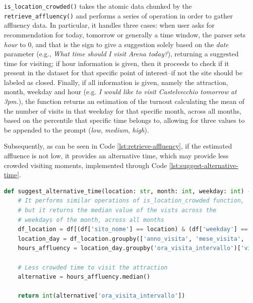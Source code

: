 \texttt{is\_location\_crowded()} takes the atomic data chunked by the \texttt{retrieve\_affluency()} and performs a series of operation in order to gather affluency data. In particular, it handles three cases: when user asks for recommendation for today, tomorrow or generally a time window, the parser sets \textit{hour} to 0, and that is the sign to give a suggestion solely based on the \textit{date} parameter (e.g., \textit{What time should I visit Arena today?}), returning a suggested time for visiting; if hour information is given, then it proceeds to check if it present in the dataset for that specific point of interest--if not the site should be labeled as closed. Finally, if all information is given, namely the attraction, month, weekday and hour (e.g. \textit{I would like to visit Castelvecchio tomorrow at 3pm.}), the function returns an estimation of the turnout calculating the mean of the number of visits in that weekday for that specific month, across all months, based on the percentile that specific time belongs to, allowing for three values to be appended to the prompt (\textit{low}, \textit{medium}, \textit{high}).

Subsequently, as can be seen in Code \ref{lst:retrieve-affluency}, if the estimated affluence is not low, it provides an alternative time, which may provide less crowded visiting moments, implemented through Code \ref{lst:suggest-alternative-time}.

\begin{center}
\begin{lstlisting}[language=Python, frame=single, caption=\texttt{suggest\_alternative\_time()} Function., label=lst:suggest-alternative-time]
def suggest_alternative_time(location: str, month: int, weekday: int) -> str:
    # It performs similar operations of is_location_crowded function,
    # but it returns the median value of the vists across the
    # weekdays of the month, across all months
    df_location = df[(df['sito_nome'] == location) & (df['weekday'] == int(weekday)) & (df['mese_visita'] == int(month))]
    location_day = df_location.groupby(['anno_visita', 'mese_visita', 'weekday', 'ora_visita_intervallo']).size().reset_index(name='visit_count')
    hours_affluency = location_day.groupby('ora_visita_intervallo')['visit_count'].agg(lambda x: x.mean()).reset_index(name='mean_visits')

    # Less crowded time to visit the attraction
    alternative = hours_affluency.median()

    return int(alternative['ora_visita_intervallo'])
\end{lstlisting}
\end{center}

